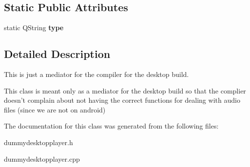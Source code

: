 \subsection*{Static Public Attributes}
\begin{DoxyCompactItemize}
\item 
\hypertarget{classDummyDesktopPlayer_af35635076411f1a0a0431cf78438168c}{static Q\-String {\bfseries type}}\label{classDummyDesktopPlayer_af35635076411f1a0a0431cf78438168c}

\end{DoxyCompactItemize}


\subsection{Detailed Description}
This is just a mediator for the compiler for the desktop build. 

This class is meant only as a mediator for the desktop build so that the complier doesn't complain about not having the correct functions for dealing with audio files (since we are not on android) 

The documentation for this class was generated from the following files\-:\begin{DoxyCompactItemize}
\item 
dummydesktopplayer.\-h\item 
dummydesktopplayer.\-cpp\end{DoxyCompactItemize}

